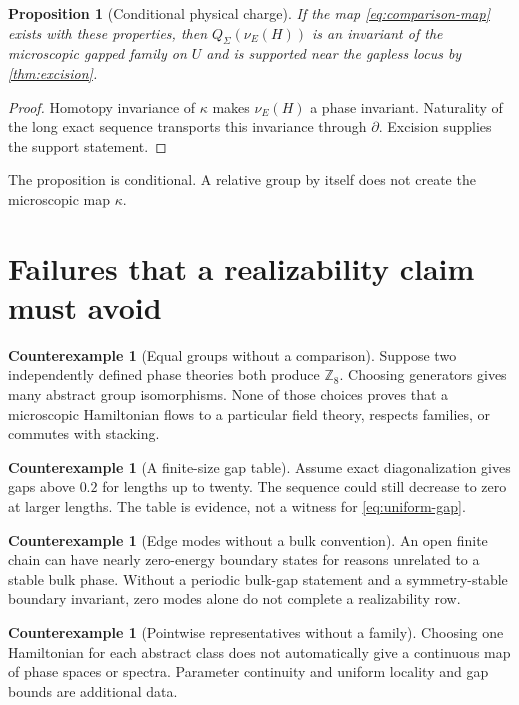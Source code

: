 \documentclass[12pt]{article}
\newtheorem{proposition}[theorem]{Proposition}
\theoremstyle{definition}
\newtheorem{counterexample}[theorem]{Counterexample}
\theoremstyle{remark}
\begin{document}
\begin{proposition}[Conditional physical charge]
If the map \cref{eq:comparison-map} exists with these properties, then
$Q_\Sigma(\nu_E(H))$ is an invariant of the microscopic gapped family on
$U$ and is supported near the gapless locus by \cref{thm:excision}.
\end{proposition}

\begin{proof}
Homotopy invariance of $\kappa$ makes $\nu_E(H)$ a phase invariant.
Naturality of the long exact sequence transports this invariance through
$\partial$.  Excision supplies the support statement.
\end{proof}

The proposition is conditional.  A relative group by itself does not create
the microscopic map $\kappa$.

\section{Failures that a realizability claim must avoid}

\begin{counterexample}[Equal groups without a comparison]
Suppose two independently defined phase theories both produce
$\mathbb Z_8$.  Choosing generators gives many abstract group isomorphisms.
None of those choices proves that a microscopic Hamiltonian flows to a
particular field theory, respects families, or commutes with stacking.
\end{counterexample}

\begin{counterexample}[A finite-size gap table]
Assume exact diagonalization gives gaps above $0.2$ for lengths up to twenty.
The sequence could still decrease to zero at larger lengths.  The table is
evidence, not a witness for \cref{eq:uniform-gap}.
\end{counterexample}

\begin{counterexample}[Edge modes without a bulk convention]
An open finite chain can have nearly zero-energy boundary states for reasons
unrelated to a stable bulk phase.  Without a periodic bulk-gap statement and
a symmetry-stable boundary invariant, zero modes alone do not complete a
realizability row.
\end{counterexample}

\begin{counterexample}[Pointwise representatives without a family]
Choosing one Hamiltonian for each abstract class does not automatically give
a continuous map of phase spaces or spectra.  Parameter continuity and
uniform locality and gap bounds are additional data.
\end{counterexample}
\end{document}
